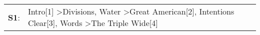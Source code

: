 \begin{supertabular}{p{0.03\textwidth}p{0.92\textwidth}}
 \textbf{S1}:  &  Intro[1]\textsuperscript{} \textgreater \enspace Divisions\textsuperscript{}, \enspace Water\textsuperscript{} \textgreater \enspace Great American[2]\textsuperscript{}, \enspace Intentions Clear[3]\textsuperscript{}, \enspace Words\textsuperscript{} \textgreater \enspace The Triple Wide[4]\textsuperscript{}  \enspace  \\
\end{supertabular}
